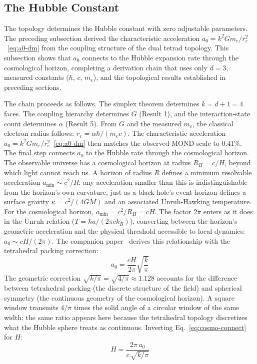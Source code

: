 \documentclass[aps,prd,preprint,superscriptaddress,showpacs,preprintnumbers,amsmath,amssymb,nofootinbib]{revtex4-2}
\begin{document}
\subsection{The Hubble Constant}
\label{subsec:hubble}

The topology determines the Hubble constant with zero adjustable parameters. The preceding subsection derived the characteristic acceleration $a_0 = k^2 G m_e / r_e^2$~\eqref{eq:a0-dm} from the coupling structure of the dual tetrad topology. This subsection shows that $a_0$ connects to the Hubble expansion rate through the cosmological horizon, completing a derivation chain that uses only $d = 3$, measured constants ($\hbar$, $c$, $m_e$), and the topological results established in preceding sections.

The chain proceeds as follows. The simplex theorem determines $k = d + 1 = 4$ faces. The coupling hierarchy determines $G$ (Result 1), and the interaction-state count determines $\alpha$ (Result 5). From $G$ and the measured $m_e$, the classical electron radius follows: $r_e = \alpha \hbar / (m_e c)$. The characteristic acceleration $a_0 = k^2 G m_e / r_e^2$~\eqref{eq:a0-dm} then matches the observed MOND scale to 0.41\%. The final step connects $a_0$ to the Hubble rate through the cosmological horizon. The observable universe has a cosmological horizon at radius $R_H = c/H$, beyond which light cannot reach us. A horizon of radius $R$ defines a minimum resolvable acceleration $a_{\min} \sim c^2/R$: any acceleration smaller than this is indistinguishable from the horizon's own curvature, just as a black hole's event horizon defines a surface gravity $\kappa = c^2/(4GM)$ and an associated Unruh-Hawking temperature. For the cosmological horizon, $a_{\min} = c^2/R_H = cH$. The factor $2\pi$ enters as it does in the Unruh relation ($T = \hbar a/(2\pi c k_B)$), converting between the horizon's geometric acceleration and the physical threshold accessible to local dynamics: $a_0 \sim cH/(2\pi)$. The companion paper~\cite{paper5} derives this relationship with the tetrahedral packing correction:
\begin{equation}
a_0 = \frac{cH}{2\pi} \sqrt{\frac{k}{\pi}}
\label{eq:cosmo-connect}
\end{equation}
The geometric correction $\sqrt{k/\pi} = \sqrt{4/\pi} \approx 1.128$ accounts for the difference between tetrahedral packing (the discrete structure of the field) and spherical symmetry (the continuous geometry of the cosmological horizon). A square window transmits $4/\pi$ times the solid angle of a circular window of the same width; the same ratio appears here because the tetrahedral topology discretizes what the Hubble sphere treats as continuous. Inverting Eq.~\eqref{eq:cosmo-connect} for $H$:
\begin{equation}
H = \frac{2\pi \, a_0}{c \, \sqrt{k/\pi}}
\label{eq:hubble-predict}
\end{equation}
\end{document}
